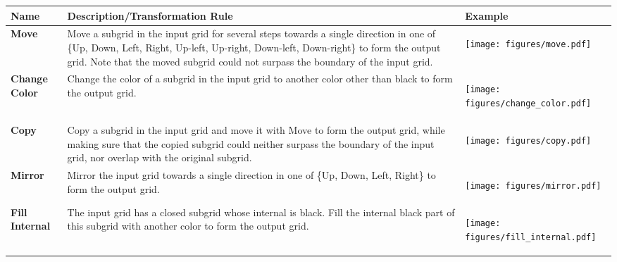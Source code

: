 \begin{table*}[tb]
  \renewcommand\arraystretch{1.1}
  \centering
  \setlength{\tabcolsep}{2mm}
  \small
  \begin{tabular}{p{2cm}p{7cm}p{5cm}}
    \toprule[1pt]
   
     \textbf{Name} & \textbf{Description/Transformation Rule} & \textbf{Example} \\
     \midrule[0.5pt]
    \textbf{Move} & Move a subgrid in the input grid for several steps towards a single direction in one of \{Up, Down, Left, Right, Up-left, Up-right, Down-left, Down-right\} to form the output grid. Note that the moved subgrid could not surpass the boundary of the input grid. & \begin{center}\vspace{-1mm}\texttt{[image: figures/move.pdf]}\vspace{-3mm}\end{center} \\
    \midrule[0.5pt]
   \textbf{Change Color} & Change the color of a subgrid in the input grid to another color other than black to form the output grid. & \vspace{-3.5mm} \begin{center}\texttt{[image: figures/change\_color.pdf]}\end{center}\vspace{-5mm} \\
   \midrule[0.5pt]
   \textbf{Copy} & Copy a subgrid in the input grid and move it with Move to form the output grid, while making sure that the copied subgrid could neither surpass the boundary of the input grid, nor overlap with the original subgrid. & \vspace{-3.5mm} \begin{center}\texttt{[image: figures/copy.pdf]}\end{center} \vspace{-5.5mm} \\
   \midrule[0.5pt]
   \textbf{Mirror} & Mirror the input grid towards a single direction in one of \{Up, Down, Left, Right\} to form the output grid. & \vspace{-4mm} \begin{center}\texttt{[image: figures/mirror.pdf]}\end{center} \vspace{-5.5mm}\\
   \midrule[0.5pt]
   \textbf{Fill Internal} & The input grid has a closed subgrid whose internal is black. Fill the internal black part of this subgrid with another color to form the output grid. &\vspace{-3mm} \begin{center}\texttt{[image: figures/fill\_internal.pdf]}\end{center} \vspace{-6.5mm} \\

\end{tabular}
\end{table*}
